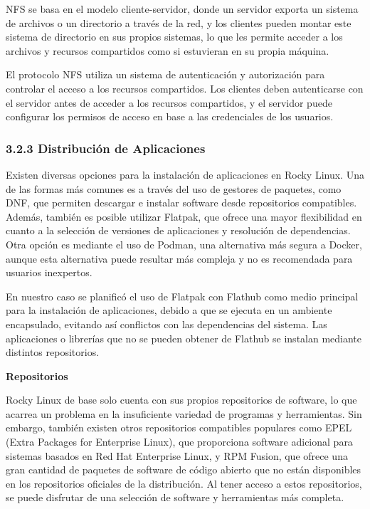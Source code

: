 \begin{spacing}{1.5}
  NFS se basa en el modelo cliente-servidor, donde un servidor exporta un
  sistema de archivos o un directorio a través de la red, y los clientes pueden
  montar este sistema de directorio en sus propios sistemas, lo que les permite
  acceder a los archivos y recursos compartidos como si estuvieran en su propia
  máquina.

  El protocolo NFS utiliza un sistema de autenticación y autorización para
  controlar el acceso a los recursos compartidos. Los clientes deben autenticarse
  con el servidor antes de acceder a los recursos compartidos, y el servidor
  puede configurar los permisos de acceso en base a las credenciales de los
  usuarios. \cite{RHEL-NFS-1} \cite{RHEL-NFS-2}

  \subsubsection{3.2.3 Distribución de Aplicaciones}
  Existen diversas opciones para la instalación de aplicaciones en Rocky
  Linux. Una de las formas más comunes es a través del uso de gestores de
  paquetes, como DNF, que permiten descargar e instalar software desde
  repositorios compatibles. Además, también es posible utilizar Flatpak, que
  ofrece una mayor flexibilidad en cuanto a la selección de versiones de
  aplicaciones y resolución de dependencias. Otra opción es mediante el uso de
  Podman, una alternativa más segura a Docker, aunque esta alternativa puede
  resultar más compleja y no es recomendada para usuarios inexpertos.

  En nuestro caso se planificó el uso de Flatpak con Flathub como medio
  principal para la instalación de aplicaciones, debido a que se ejecuta en un
  ambiente encapsulado, evitando así conflictos con las dependencias del sistema.
  Las aplicaciones o librerías que no se pueden obtener de Flathub se instalan
  mediante distintos repositorios.

  \textbf{Repositorios}

  Rocky Linux de base solo cuenta con sus propios repositorios de software,
  lo que acarrea un problema en la insuficiente variedad de programas y
  herramientas. Sin embargo, también existen otros repositorios compatibles
  populares como EPEL (Extra Packages for Enterprise Linux), que proporciona
  software adicional para sistemas basados en Red Hat Enterprise Linux, y RPM
  Fusion, que ofrece una gran cantidad de paquetes de software de código abierto
  que no están disponibles en los repositorios oficiales de la distribución. Al
  tener acceso a estos repositorios, se puede disfrutar de una selección de
  software y herramientas más completa. \cite{RL-repo-1} \cite{RHEL-EPEL-1}
  \cite{rpmfusion-1}


\end{spacing}
